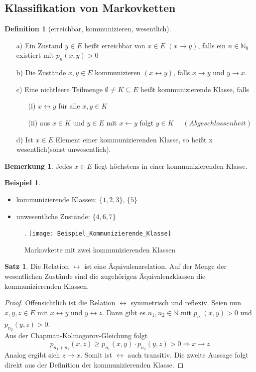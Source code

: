 \documentclass[a4paper,12pt]{scrartcl}
\theoremstyle{definition}
\newtheorem{bem}{Bemerkung}[section]
\newtheorem{sat}{Satz}[section]
\newtheorem{bsp}{Beispiel}[section]
\newtheorem{defi}{Definition}[section]
\begin{document}
\subsection{Klassifikation von Markovketten}
\begin{defi}[erreichbar, kommunizieren, wesentlich]
\mbox{}
\begin{itemize}
\item[a)] Ein Zustand $y \in E$ heißt erreichbar von $x \in E$ $(x \rightarrow y)$, falls ein $n \in \mathbb{N}_{0}$ existiert mit $p_{n}(x,y)>0$
\item[b)] Die Zustände $x,y \in E$ kommunizieren $(x\leftrightarrow y)$, falls $x \rightarrow y$ und $y \rightarrow x$. 
\item[c)] Eine nichtleere Teilmenge $\emptyset \neq K \subseteq E$ heißt kommunizierende Klasse, falls
\begin{itemize}
\item[(i)] $x \leftrightarrow y$ für alle $x,y \in K$
\item[(ii)] aus $x \in K$ und $y \in E$ mit $x \leftarrow y$ folgt $y \in K$ $\quad (Abgeschlossenheit)$
\end{itemize}
\item[d)] Ist $x \in E$ Element einer kommunizierenden Klasse, so heißt x wesentlich(sonst unwesentlich).
\end{itemize}
\end{defi}
\begin{bem}
Jedes $x \in E$ liegt höchstens in einer kommunizierenden Klasse. 
\end{bem}
\begin{bsp}
\mbox{}
\begin{itemize}
\item kommunizierende Klassen: $\lbrace 1,2,3 \rbrace$, $\lbrace 5 \rbrace$
\item unwesentliche Zustände: $\lbrace 4,6,7 \rbrace$
\end{itemize}
\begin{figure}[H].
\centering
\texttt{[image: Beispiel\_Kommunizierende\_Klasse]}
\caption{Markovkette mit zwei kommunizierenden Klassen}
\end{figure}
\noindent
\end{bsp}
\begin{sat}
Die Relation $\leftrightarrow$ ist eine Äquivalenzrelation. Auf der Menge der wesentlichen Zustände sind die zugehörigen Äquivalenzklassen die kommunizierenden Klassen.
\end{sat}
\begin{proof}
Offensichtlich ist die Relation $\leftrightarrow$ symmetrisch und reflexiv. Seien nun $x,y,z \in E$ mit $x \leftrightarrow y$ und $y \leftrightarrow z$. Dann gibt es $n_{1},n_{2} \in \mathbb{N}$ mit $p_{n_{1}}(x,y)>0$ und $p_{n_{2}}(y,z)>0$.
\\
Aus der Chapman-Kolmogorov-Gleichung folgt
\begin{equation*}
p_{n_{1} + n_{2}}(x,z) \geq p_{n_{1}}(x,y) \cdot p_{n_{2}}(y,z) > 0 \Rightarrow x \rightarrow z
\end{equation*}
Analog ergibt sich $z \rightarrow x$. Somit ist $\leftrightarrow$ auch transitiv. Die zweite Aussage folgt direkt aus der Definition der kommunizierenden Klasse.
\end{proof}
\end{document}
